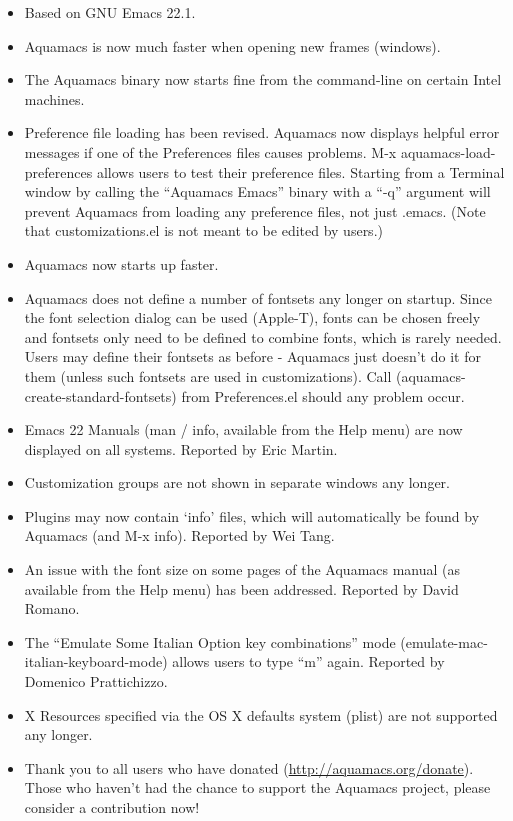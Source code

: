 \begin{itemize}

\item Based on GNU Emacs 22.1.

\item Aquamacs is now much faster when opening new frames (windows).

\item The Aquamacs binary now starts fine from the command-line on certain Intel machines.

\item Preference file loading has been revised.  Aquamacs now
  displays helpful error messages if one of the Preferences files
  causes problems. M-x aquamacs-load-preferences allows users to test
  their preference files. Starting from a Terminal window by calling
  the ``Aquamacs Emacs'' binary with a ``-q'' argument will prevent
  Aquamacs from loading any preference files, not just .emacs.
(Note that customizations.el is not meant to be edited by users.)

\item Aquamacs now starts up faster.

\item Aquamacs does not define a number of fontsets any longer on
  startup. Since the font selection dialog can be used (Apple-T),
  fonts can be chosen freely and fontsets only need to be defined to
  combine fonts, which is rarely needed. Users may define their
  fontsets as before - Aquamacs just doesn't do it for them (unless
  such fontsets are used in customizations).
  Call (aquamacs-create-standard-fontsets) from Preferences.el should
  any problem occur.

\item Emacs 22 Manuals (man / info, available from the Help menu)  are
  now displayed on all systems.
  Reported by Eric Martin.

\item Customization groups are not shown in separate windows any longer.

\item Plugins may now contain `info' files, which will automatically
  be found by Aquamacs (and M-x info).
Reported by Wei Tang.

\item An issue with the font size on some pages of the Aquamacs manual
  (as available from the Help menu) has been addressed.
Reported by David Romano.

\item The ``Emulate Some Italian Option key combinations'' mode   (emulate-mac-italian-keyboard-mode) allows users to type ``m'' again.   Reported by Domenico Prattichizzo.

\item X Resources specified via the OS X defaults system (plist) are
  not supported any longer.

\item Thank you to all users who have donated
        (\url{http://aquamacs.org/donate}). Those who haven't had the
        chance to support the Aquamacs project, please consider a
        contribution now!

\end{itemize}

